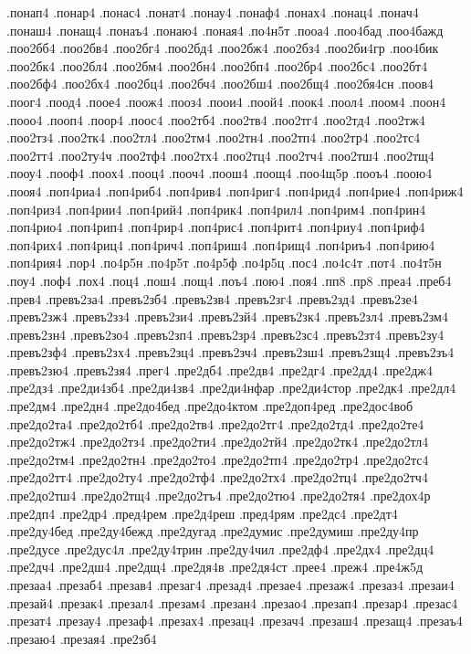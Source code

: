 {.понап4
.понар4
.понас4
.понат4
.понау4
.понаф4
.понах4
.понац4
.понач4
.понаш4
.понащ4
.понаъ4
.понаю4
.поная4
.по4н5т
.пооа4
.поо4бад
.поо4бажд
.поо2бб4
.поо2бв4
.поо2бг4
.поо2бд4
.поо2бж4
.поо2бз4
.поо2би4гр
.поо4бик
.поо2бк4
.поо2бл4
.поо2бм4
.поо2бн4
.поо2бп4
.поо2бр4
.поо2бс4
.поо2бт4
.поо2бф4
.поо2бх4
.поо2бц4
.поо2бч4
.поо2бш4
.поо2бщ4
.поо2бя4сн
.поов4
.поог4
.поод4
.поое4
.поож4
.пооз4
.поои4
.поой4
.поок4
.поол4
.поом4
.поон4
.пооо4
.пооп4
.поор4
.поос4
.поо2тб4
.поо2тв4
.поо2тг4
.поо2тд4
.поо2тж4
.поо2тз4
.поо2тк4
.поо2тл4
.поо2тм4
.поо2тн4
.поо2тп4
.поо2тр4
.поо2тс4
.поо2тт4
.поо2ту4ч
.поо2тф4
.поо2тх4
.поо2тц4
.поо2тч4
.поо2тш4
.поо2тщ4
.пооу4
.пооф4
.поох4
.пооц4
.пооч4
.поош4
.поощ4
.поо4щ5р
.пооъ4
.поою4
.пооя4
.поп4риа4
.поп4риб4
.поп4рив4
.поп4риг4
.поп4рид4
.поп4рие4
.поп4риж4
.поп4риз4
.поп4рии4
.поп4рий4
.поп4рик4
.поп4рил4
.поп4рим4
.поп4рин4
.поп4рио4
.поп4рип4
.поп4рир4
.поп4рис4
.поп4рит4
.поп4риу4
.поп4риф4
.поп4рих4
.поп4риц4
.поп4рич4
.поп4риш4
.поп4рищ4
.поп4риъ4
.поп4рию4
.поп4рия4
.пор4
.по4р5н
.по4р5т
.по4р5ф
.по4р5ц
.пос4
.по4с4т
.пот4
.по4т5н
.поу4
.поф4
.пох4
.поц4
.пош4
.пощ4
.поъ4
.пою4
.поя4
.пп8
.пр8
.преа4
.преб4
.прев4
.превъ2за4
.превъ2зб4
.превъ2зв4
.превъ2зг4
.превъ2зд4
.превъ2зе4
.превъ2зж4
.превъ2зз4
.превъ2зи4
.превъ2зй4
.превъ2зк4
.превъ2зл4
.превъ2зм4
.превъ2зн4
.превъ2зо4
.превъ2зп4
.превъ2зр4
.превъ2зс4
.превъ2зт4
.превъ2зу4
.превъ2зф4
.превъ2зх4
.превъ2зц4
.превъ2зч4
.превъ2зш4
.превъ2зщ4
.превъ2зъ4
.превъ2зю4
.превъ2зя4
.прег4
.пре2дб4
.пре2дв4
.пре2дг4
.пре2дд4
.пре2дж4
.пре2дз4
.пре2ди4зб4
.пре2ди4зв4
.пре2ди4нфар
.пре2ди4стор
.пре2дк4
.пре2дл4
.пре2дм4
.пре2дн4
.пре2до4бед
.пре2до4ктом
.пре2доп4ред
.пре2дос4воб
.пре2до2та4
.пре2до2тб4
.пре2до2тв4
.пре2до2тг4
.пре2до2тд4
.пре2до2те4
.пре2до2тж4
.пре2до2тз4
.пре2до2ти4
.пре2до2тй4
.пре2до2тк4
.пре2до2тл4
.пре2до2тм4
.пре2до2тн4
.пре2до2то4
.пре2до2тп4
.пре2до2тр4
.пре2до2тс4
.пре2до2тт4
.пре2до2ту4
.пре2до2тф4
.пре2до2тх4
.пре2до2тц4
.пре2до2тч4
.пре2до2тш4
.пре2до2тщ4
.пре2до2тъ4
.пре2до2тю4
.пре2до2тя4
.пре2дох4р
.пре2дп4
.пре2др4
.пред4рем
.пре2д4реш
.пред4рям
.пре2дс4
.пре2дт4
.пре2ду4бед
.пре2ду4бежд
.пре2дугад
.пре2думис
.пре2думиш
.пре2ду4пр
.пре2дусе
.пре2дус4л
.пре2ду4трин
.пре2ду4чил
.пре2дф4
.пре2дх4
.пре2дц4
.пре2дч4
.пре2дш4
.пре2дщ4
.пре2дя4в
.пре2дя4ст
.прее4
.преж4
.пре4ж5д
.презаа4
.презаб4
.презав4
.презаг4
.презад4
.презае4
.презаж4
.презаз4
.презаи4
.презай4
.презак4
.презал4
.презам4
.презан4
.презао4
.презап4
.презар4
.презас4
.презат4
.презау4
.презаф4
.презах4
.презац4
.презач4
.презаш4
.презащ4
.презаъ4
.презаю4
.презая4
.пре2зб4
}
